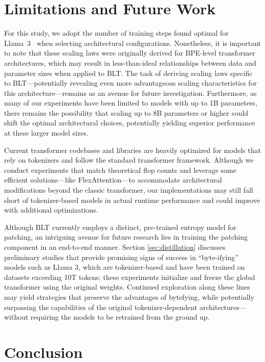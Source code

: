 \section{Limitations and Future Work}

For this study, we adopt the number of training steps found optimal for Llama~3~\citep{dubey2024llama} when selecting architectural configurations. Nonetheless, it is important to note that these scaling laws were originally derived for BPE-level transformer architectures, which may result in less-than-ideal relationships between data and parameter sizes when applied to {\textsc BLT}. The task of deriving scaling laws specific to {\textsc BLT}—potentially revealing even more advantageous scaling characteristics for this architecture—remains as an avenue for future investigation. Furthermore, as many of our experiments have been limited to models with up to 1B parameters, there remains the possibility that scaling up to 8B parameters or higher could shift the optimal architectural choices, potentially yielding superior performance at these larger model sizes.

Current transformer codebases and libraries are heavily optimized for models that rely on tokenizers and follow the standard transformer framework. Although we conduct experiments that match theoretical flop counts and leverage some efficient solutions—like FlexAttention—to accommodate architectural modifications beyond the classic transformer, our implementations may still fall short of tokenizer-based models in actual runtime performance and could improve with additional optimizations.

Although {\textsc BLT} currently employs a distinct, pre-trained entropy model for patching, an intriguing avenue for future research lies in training the patching component in an end-to-end manner. Section \ref{sec:distillation} discusses preliminary studies that provide promising signs of success in ``byte-ifying'' models such as Llama 3, which are tokenizer-based and have been trained on datasets exceeding 10T tokens; these experiments initialize and freeze the global transformer using the original weights. Continued exploration along these lines may yield strategies that preserve the advantages of bytefying, while potentially surpassing the capabilities of the original tokenizer-dependent architectures—without requiring the models to be retrained from the ground up.

\section{Conclusion}
\label{section:conclusion}

